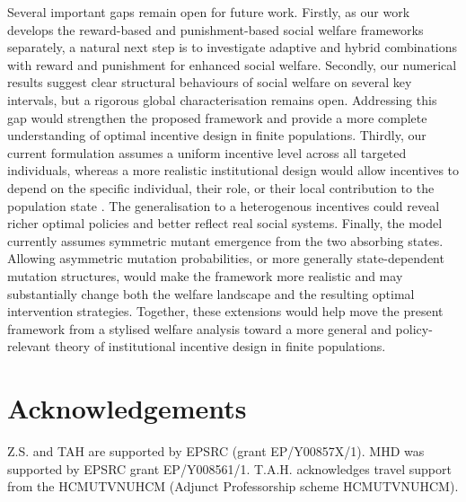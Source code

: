 \documentclass{article}
\begin{document}
Several important gaps remain open for future work. Firstly, as our work develops the reward-based and punishment-based social welfare frameworks separately, a natural next step is to  investigate adaptive and hybrid combinations \cite{chen2015first,liu2025evolution,duong2023cost,liu2026dynamic} with  reward and punishment for enhanced social welfare. Secondly, our numerical results suggest clear structural behaviours of social welfare on several key intervals, but a rigorous global characterisation remains open. Addressing this gap would strengthen the proposed framework and provide a more complete understanding of optimal incentive design in finite populations. Thirdly, our current formulation assumes a uniform incentive level across all targeted individuals, whereas a more realistic institutional design would allow incentives to depend on the specific individual, their role, or their local contribution to the population state \cite{perc2015double,cimpeanu2025hidden,cimpeanu2021cost,alalawi2026trust}. The generalisation to a heterogenous incentives could reveal richer optimal policies and better reflect real social systems. Finally, the model currently assumes symmetric mutant emergence from the two absorbing states. Allowing asymmetric mutation probabilities, or more generally state-dependent mutation structures, would make the framework more realistic and may substantially change both the welfare landscape and the resulting optimal intervention strategies. Together, these extensions would help move the present framework from a stylised welfare analysis toward a more general and policy-relevant theory of institutional incentive design in finite populations. 



\section*{Acknowledgements}
 Z.S. and TAH are supported by EPSRC (grant EP/Y00857X/1). MHD was supported by EPSRC grant EP/Y008561/1. 
T.A.H. acknowledges travel support from the HCMUT\text{-}VNUHCM (Adjunct Professorship scheme HCMUT\text{-}VNUHCM).
\end{document}
